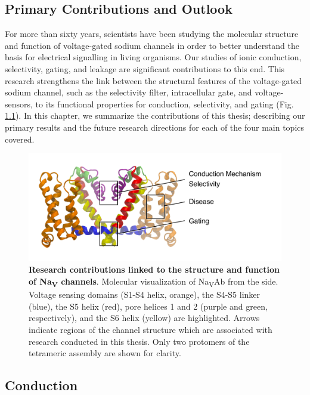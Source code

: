  \begin{refsection}
 \chapter{Primary Contributions and Outlook}

For more than sixty years, scientists have been studying the molecular structure and function of voltage-gated sodium channels in order to better understand the basis for electrical signalling in living organisms. Our studies of ionic conduction, selectivity, gating, and leakage are significant contributions to this end. This research strengthens the link between the structural features of the voltage-gated sodium channel, such as the selectivity filter, intracellular gate, and voltage-sensors, to its functional properties for conduction, selectivity, and gating (Fig. \ref{fig:outlookFig1}). In this chapter, we summarize the contributions of this thesis; describing our primary results and the future research directions for each of the four main topics covered.

\begin{figure}[hp]
\includegraphics[width=1.0\textwidth]{outlook/outlookFig1}
\caption[Research contributions linking molecular structure to the function of Na\textsubscript{V} channels]{\textbf{Research contributions linked to the structure and function of Na\textsubscript{V} channels}. Molecular visualization of Na\textsubscript{V}Ab from the side. Voltage sensing domains (S1-S4 helix, orange), the S4-S5 linker (blue), the S5 helix (red), pore helices 1 and 2 (purple and green, respectively), and the S6 helix (yellow) are highlighted. Arrows indicate regions of the channel structure which are associated with research conducted in this thesis. Only two protomers of the tetrameric assembly are shown for clarity.}
\label{fig:outlookFig1}
\centering
\end{figure}

\section{Conduction}


\end{refsection}
